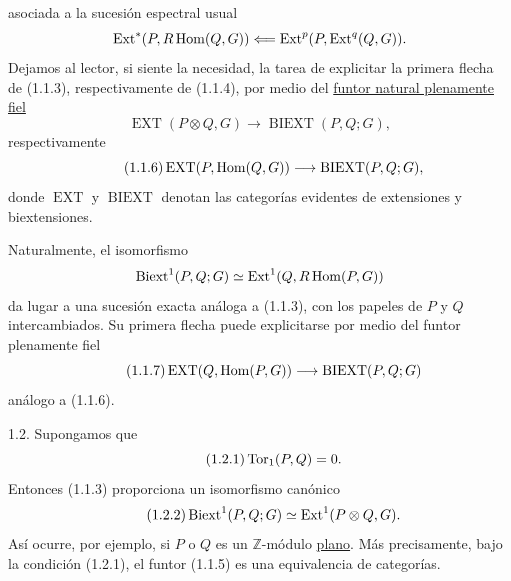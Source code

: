 
asociada a la sucesión espectral usual
\[
 \operatorname{Ext}^*(P,R\operatorname{Hom}(Q,G))
 \Longleftarrow
 \operatorname{Ext}^p(P,\operatorname{Ext}^q(Q,G)).
\]
Dejamos al lector, si siente la necesidad, la tarea de explicitar la
primera flecha de (1.1.3), respectivamente de (1.1.4), por medio del
\underline{funtor natural plenamente fiel}
\begin{equation}\tag{1.1.5}
 \operatorname{EXT}(P\otimes Q,G)
 \longrightarrow
 \operatorname{BIEXT}(P,Q;G),
\end{equation}
respectivamente
\begin{equation}\tag{1.1.6}
 \operatorname{EXT}(P,\operatorname{Hom}(Q,G))
 \longrightarrow
 \operatorname{BIEXT}(P,Q;G),
\end{equation}
donde $\operatorname{EXT}$ y $\operatorname{BIEXT}$ denotan las
categorías evidentes de extensiones y biextensiones.

Naturalmente, el isomorfismo
\[
 \operatorname{Biext}^1(P,Q;G)\simeq\operatorname{Ext}^1(Q,R\operatorname{Hom}(P,G))
\]
da lugar a una sucesión exacta análoga a (1.1.3), con los papeles de
$P$ y $Q$ intercambiados. Su primera flecha puede explicitarse por
medio del funtor plenamente fiel
\begin{equation}\tag{1.1.7}
 \operatorname{EXT}(Q,\operatorname{Hom}(P,G))
 \longrightarrow
 \operatorname{BIEXT}(P,Q;G)
\end{equation}
análogo a (1.1.6).

1.2. Supongamos que
\begin{equation}\tag{1.2.1}
 \operatorname{Tor}_1(P,Q)=0.
\end{equation}
Entonces (1.1.3) proporciona un isomorfismo canónico
\begin{equation}\tag{1.2.2}
 \operatorname{Biext}^1(P,Q;G)\simeq\operatorname{Ext}^1(P\otimes Q,G).
\end{equation}
Así ocurre, por ejemplo, si $P$ o $Q$ es un $\mathbb Z$-módulo
\underline{plano}. Más precisamente, bajo la condición (1.2.1), el
funtor (1.1.5) es una equivalencia de categorías.



